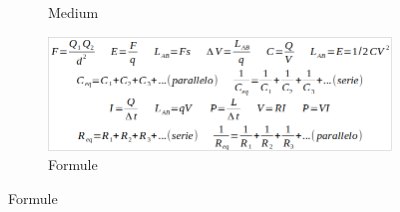 \documentclass[addpoints]{exam}
\begin{document}
\begin{figure}[h]
\begin{subfigure}{.5\textwidth}
  \caption{Medium}
  \label{fig:sfig3}
\end{subfigure}
\begin{subfigure}{.5\textwidth}
  \centering
  \includegraphics[width=1\linewidth]{Formulario.png}
  \caption{Formule}
  \label{fig:sfig3}
\end{subfigure}
\end{figure}

\begin{center}
	\gradetable[h][questions]
\end{center}
\end{document}
